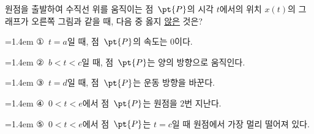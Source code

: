 \noindent\begin{minipage}[t]{0.58\linewidth}\vspace{0pt}\raggedright 원점을 출발하여 수직선 위를 움직이는 점~$\pt{P}$의 시각 $t$에서의 위치 $x(t)$의 그래프가 오른쪽 그림과 같을 때, 다음 중 옳지 \underline{않은} 것은?\end{minipage}\hfill\begin{minipage}[t]{0.4\linewidth}\vspace{0pt}\centering \resizebox{\ifdim\width>\linewidth\linewidth\else\width\fi}{!}{}\end{minipage}\par
\par\medskip\par\noindent\hangindent=1.4em {\small ①}\ $t=a$일 때, 점~$\pt{P}$의 속도는 $0$이다.\par\noindent\hangindent=1.4em {\small ②}\ $b<t<c$일 때, 점~$\pt{P}$는 양의 방향으로 움직인다.\par\noindent\hangindent=1.4em {\small ③}\ $t=d$일 때, 점~$\pt{P}$는 운동 방향을 바꾼다.\par\noindent\hangindent=1.4em {\small ④}\ $0<t<e$에서 점~$\pt{P}$는 원점을 $2$번 지난다.\par\noindent\hangindent=1.4em {\small ⑤}\ $0<t<e$에서 점~$\pt{P}$는 $t=c$일 때 원점에서 가장 멀리 떨어져 있다.\par\medskip
